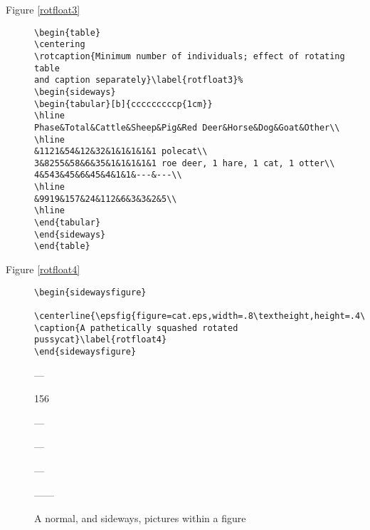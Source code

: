 \documentclass[twoside]{article}
\begin{document}
\begin{description}
\item[Figure \ref{rotfloat3}]
{\small\begin{verbatim}
\begin{table}
\centering
\rotcaption{Minimum number of individuals; effect of rotating table
and caption separately}\label{rotfloat3}%
\begin{sideways}
\begin{tabular}[b]{cccccccccp{1cm}}
\hline
Phase&Total&Cattle&Sheep&Pig&Red Deer&Horse&Dog&Goat&Other\\
\hline
&1121&54&12&32&1&1&1&1&1 polecat\\
3&8255&58&6&35&1&1&1&1&1 roe deer, 1 hare, 1 cat, 1 otter\\
4&543&45&6&45&4&1&1&---&---\\
\hline
&9919&157&24&112&6&3&3&2&5\\
\hline
\end{tabular}
\end{sideways}
\end{table}
\end{verbatim}
}

\item[Figure \ref{rotfloat4}]
{\small\begin{verbatim}
\begin{sidewaysfigure}
  \centerline{\epsfig{figure=cat.eps,width=.8\textheight,height=.4\textwidth}}
\caption{A pathetically squashed rotated pussycat}\label{rotfloat4}
\end{sidewaysfigure}
\end{verbatim}
}
\end{description}

\begin{figure}
\begin{example}
---\begin{turn}{156}
\end{turn}---
\end{example}

\begin{example}
---\begin{sideways}
\end{sideways}---
\end{example}

\begin{example}
------
\end{example}
\caption{A normal, and sideways, pictures within a figure\label{fig1}}
\end{figure}
\end{document}
